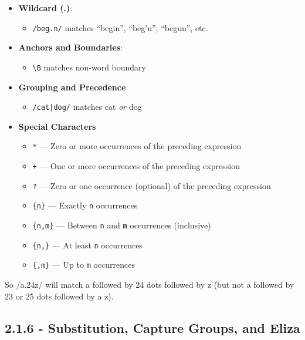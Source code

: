 \documentclass{article}
\begin{document}
\begin{itemize}
    \item \textbf{Wildcard (.)}:
          \begin{itemize}
              \item \texttt{/beg.n/} matches “begin”, “beg’n”, “begun”, etc.
          \end{itemize}

    \item \textbf{Anchors and Boundaries}:
          \begin{itemize}
              \item \texttt{\textbackslash{}B} matches non-word boundary
          \end{itemize}
    \item \textbf{Grouping and Precedence}
          \begin{itemize}
              \item \texttt{/cat|dog/} matches cat \textit{or} dog
          \end{itemize}
    \item \textbf{Special Characters}
          \begin{itemize}
              \item \texttt{*} — Zero or more occurrences of the preceding expression
              \item \texttt{+} — One or more occurrences of the preceding expression
              \item \texttt{?} — Zero or one occurrence (optional) of the preceding expression
              \item \texttt{\{n\}} — Exactly \texttt{n} occurrences
              \item \texttt{\{n,m\}} — Between \texttt{n} and \texttt{m} occurrences (inclusive)
              \item \texttt{\{n,\}} — At least \texttt{n} occurrences
              \item \texttt{\{,m\}} — Up to \texttt{m} occurrences
          \end{itemize}
\end{itemize}






So /a.{24}z/ will match
a followed by 24 dots followed by z (but not a followed by 23 or 25 dots followed
by a z).

\subsection{2.1.6 - Substitution, Capture Groups, and Eliza}
\end{document}
